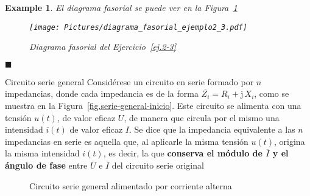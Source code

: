 \documentclass[11pt]{book} %
\makeatletter
\numberwithin{dummy}{section}
\theoremstyle{ocrenumbox}
\theoremstyle{blacknumex}
\newtheorem{exampleT}{Example}[chapter]
\theoremstyle{blacknumbox}
\theoremstyle{ocrenum}
\newenvironment{example}{\begin{exampleT}}{\hfill{\tiny\ensuremath{\blacksquare}}\end{exampleT}}
\renewcommand{\subsection}{\@startsection {subsection}{2}{\z@}
{-3ex \@plus -0.1ex \@minus -.4ex}
{0.5ex \@plus.2ex }
{\normalfont\sffamily\bfseries}}
\makeatother
\begin{document}
\begin{example}
		El diagrama fasorial se puede ver en la Figura~\ref{fig.diagrama_fasorial_ejemplo2-3}
		\begin{figure}[h]
			\centering
			\texttt{[image: Pictures/diagrama\_fasorial\_ejemplo2\_3.pdf]}
			\caption{Diagrama fasorial del Ejercicio~\ref{ej.2-3}}
			\label{fig.diagrama_fasorial_ejemplo2-3}
		\end{figure}
		
		
		
		
	\end{example}
	
	\subsection{Circuito serie general}
	Considérese un circuito en serie formado por $n$ impedancias, donde cada impedancia es de la forma $\overline{Z_i}=R_i+\mathrm{j}\,X_i$, como se muestra en la Figura~\ref{fig.serie-general-inicio}. Este circuito se alimenta con una tensión $u(t)$, de valor eficaz $U$, de manera que circula por el mismo una intensidad $i(t)$ de valor eficaz $I$. Se dice que la impedancia equivalente a las $n$ impedancias en serie es aquella que, al aplicarle la misma tensión $u(t)$, origina la misma intensidad $i(t)$, es decir, la que \textbf{conserva el módulo de $\overline{I}$ y el ángulo de fase} entre $\overline{U}$ e $\overline{I}$ del circuito serie original
	\begin{figure}[htbp]
		\centering
		\hfil
		\caption{Circuito serie general alimentado por corriente alterna}
		\label{fig.serie-general}
	\end{figure}
	
\end{document}
